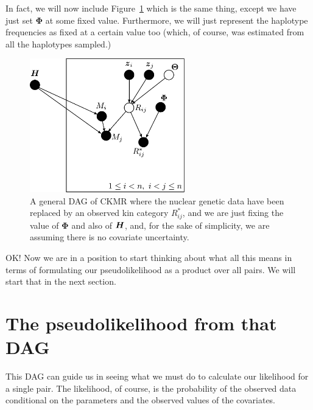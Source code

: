 \documentclass[11pt, oneside]{article}   	%
\def\bm#1{\mathpalette\bmstyle{#1}}
\def\bmstyle#1#2{\mbox{\boldmath$#1#2$}}
\newcommand{\bH}{\bm{H}}
\newcommand{\BPhi}{\mathbf{\Phi}}
\begin{document}
In fact, we will now include Figure~\ref{fig:rstar-dag-black} which is the same thing, except we have just
set $\BPhi$ at some fixed value.  Furthermore, we will just represent the haplotype frequencies as fixed
at a certain value too (which, of course, was estimated from all the haplotypes sampled.)
\begin{figure}
\begin{center}
\includegraphics[width=0.6\textwidth]{images/general-dag-4.pdf}
\end{center}
\caption{A general DAG of CKMR where the nuclear genetic data have been replaced by an observed kin category $R_{ij}^*$, 
and we are just fixing the value of $\BPhi$ and also of $\bH$, and, for the sake of simplicity, we are assuming there is no
covariate uncertainty.}
\label{fig:rstar-dag-black}
\end{figure}

OK! Now we are in a position to start thinking about what all this means in terms of formulating
our pseudolikelihood as a product over all pairs.  We will start that in the next section.

\section{The pseudolikelihood from that DAG}

This DAG can guide us in seeing what we must do to calculate our likelihood for a single pair.  The likelihood, of course,
is the probability of the observed data conditional on the parameters and the observed values of the covariates.  
\end{document}
